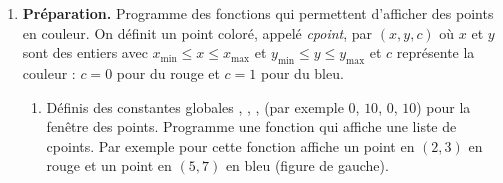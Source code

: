 \documentclass[11pt,class=report,crop=false]{standalone}
\begin{document}

\begin{activite}
	


\begin{enumerate}
	\item \textbf{Préparation.}
	Programme des fonctions qui permettent d'afficher des points en couleur.
	On définit un point coloré, appelé \emph{cpoint}, par $(x,y,c)$
	où $x$ et $y$ sont des entiers avec $x_{\min} \le x \le x_{\max}$ et $y_{\min} \le y \le y_{\max}$
	et $c$ représente la couleur : $c=0$ pour du rouge et $c=1$ pour du bleu.
	
	
	\begin{enumerate}
		\item Définis des constantes globales , , ,  (par exemple $0$, $10$, $0$, $10$) pour la fenêtre des points.
		Programme une fonction  qui affiche une liste de cpoints.
		Par exemple pour  cette fonction affiche un point en $(2,3)$ en rouge et un point en $(5,7)$ en bleu (figure de gauche).
		

\end{enumerate}
\end{enumerate}
\end{activite}
\end{document}

